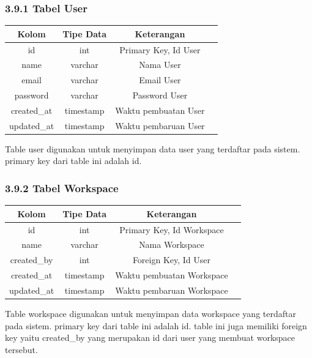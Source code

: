 \subsubsection*{3.9.1	Tabel User}
\begin{center}
  \begin{tabular}{|c|c|c|c|}
    \hline
    \textbf{Kolom} & \textbf{Tipe Data} & \textbf{Keterangan} \\
    \hline
    id & int & Primary Key, Id User \\
    name & varchar & Nama User \\
    email & varchar & Email User \\ 
    password & varchar & Password User \\
    created\_at & timestamp & Waktu pembuatan User \\
    updated\_at & timestamp & Waktu pembaruan User \\
    \hline
  \end{tabular}
\end{center}

Table user digunakan untuk menyimpan data user yang terdaftar pada sistem. primary key dari table ini adalah id.

\subsubsection*{3.9.2	Tabel Workspace}
\begin{center}
  \begin{tabular}{|c|c|c|c|}
    \hline
    \textbf{Kolom} & \textbf{Tipe Data} & \textbf{Keterangan} \\
    \hline
    id & int & Primary Key, Id Workspace \\
    name & varchar & Nama Workspace \\
    created\_by & int & Foreign Key, Id User \\
    created\_at & timestamp & Waktu pembuatan Workspace \\
    updated\_at & timestamp & Waktu pembaruan Workspace \\
    \hline
  \end{tabular}
\end{center}

Table workspace digunakan untuk menyimpan data workspace yang terdaftar pada sistem. primary key dari table ini adalah id.
table ini juga memiliki foreign key yaitu created\_by yang merupakan id dari user yang membuat workspace tersebut.

